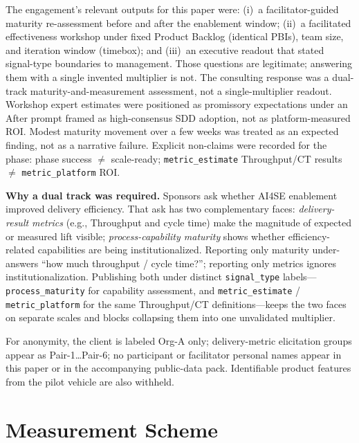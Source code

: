 \documentclass[10pt,conference]{IEEEtran}
\begin{document}
The engagement's relevant outputs for this paper were: (i)~a facilitator-guided maturity re-assessment before and after the enablement window; (ii)~a facilitated effectiveness workshop under fixed Product Backlog (identical PBIs), team size, and iteration window (timebox); and (iii)~an executive readout that stated signal-type boundaries to management.
Those questions are legitimate; answering them with a single invented multiplier is not.
The consulting response was a dual-track maturity-and-measurement assessment, not a single-multiplier readout.
Workshop expert estimates were positioned as promissory expectations under an After prompt framed as high-consensus SDD adoption, not as platform-measured ROI.
Modest maturity movement over a few weeks was treated as an expected finding, not as a narrative failure.
Explicit non-claims were recorded for the phase: phase success $\neq$ scale-ready; \texttt{metric\_estimate} Throughput/CT results $\neq$ \texttt{metric\_platform} ROI.

\textbf{Why a dual track was required.}
Sponsors ask whether AI4SE enablement improved delivery efficiency.
That ask has two complementary faces: \emph{delivery-result metrics} (e.g., Throughput and cycle time) make the magnitude of expected or measured lift visible; \emph{process-capability maturity} shows whether efficiency-related capabilities are being institutionalized.
Reporting only maturity under-answers ``how much throughput / cycle time?''; reporting only metrics ignores institutionalization.
Publishing both under distinct \texttt{signal\_type} labels---\texttt{process\_maturity} for capability assessment, and \texttt{metric\_estimate} / \texttt{metric\_platform} for the same Throughput/CT definitions---keeps the two faces on separate scales and blocks collapsing them into one unvalidated multiplier.

For anonymity, the client is labeled Org-A only; delivery-metric elicitation groups appear as Pair-1\ldots Pair-6; no participant or facilitator personal names appear in this paper or in the accompanying public-data pack.
Identifiable product features from the pilot vehicle are also withheld.

\section{Measurement Scheme}
\label{sec:scheme}
\end{document}

